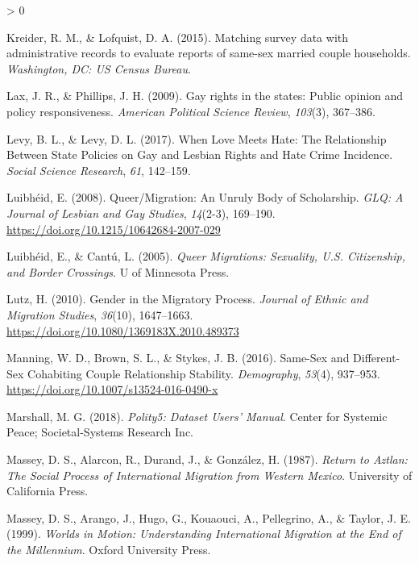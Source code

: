 \documentclass[
  11pt,
]{article}
\newlength{\cslhangindent}
\newenvironment{CSLReferences}[2] %
 {%
  \setlength{\parindent}{0pt}
  \ifodd #1 \everypar{\setlength{\hangindent}{\cslhangindent}}\ignorespaces\fi
  \ifnum #2 > 0
  \setlength{\parskip}{#2\baselineskip}
  \fi
 }%
 {}
\begin{document}
\begin{CSLReferences}{1}{0}
\leavevmode\hypertarget{ref-kreider_2015}{}%
Kreider, R. M., \& Lofquist, D. A. (2015). Matching survey data with administrative records to evaluate reports of same-sex married couple households. \emph{Washington, DC: US Census Bureau}.

\leavevmode\hypertarget{ref-lax_2009}{}%
Lax, J. R., \& Phillips, J. H. (2009). Gay rights in the states: {Public} opinion and policy responsiveness. \emph{American Political Science Review}, \emph{103}(3), 367--386.

\leavevmode\hypertarget{ref-levy_2017}{}%
Levy, B. L., \& Levy, D. L. (2017). When {Love} {Meets} {Hate}: {The} {Relationship} {Between} {State} {Policies} on {Gay} and {Lesbian} {Rights} and {Hate} {Crime} {Incidence}. \emph{Social Science Research}, \emph{61}, 142--159.

\leavevmode\hypertarget{ref-luibheid_2008}{}%
Luibhéid, E. (2008). Queer/{Migration}: {An} {Unruly} {Body} of {Scholarship}. \emph{GLQ: A Journal of Lesbian and Gay Studies}, \emph{14}(2-3), 169--190. \url{https://doi.org/10.1215/10642684-2007-029}

\leavevmode\hypertarget{ref-luibheid_2005}{}%
Luibhéid, E., \& Cantú, L. (2005). \emph{Queer {Migrations}: {Sexuality}, {U}.{S}. {Citizenship}, and {Border} {Crossings}}. U of Minnesota Press.

\leavevmode\hypertarget{ref-lutz_2010}{}%
Lutz, H. (2010). Gender in the {Migratory} {Process}. \emph{Journal of Ethnic and Migration Studies}, \emph{36}(10), 1647--1663. \url{https://doi.org/10.1080/1369183X.2010.489373}

\leavevmode\hypertarget{ref-manning_2016}{}%
Manning, W. D., Brown, S. L., \& Stykes, J. B. (2016). Same-{Sex} and {Different}-{Sex} {Cohabiting} {Couple} {Relationship} {Stability}. \emph{Demography}, \emph{53}(4), 937--953. \url{https://doi.org/10.1007/s13524-016-0490-x}

\leavevmode\hypertarget{ref-marshall_2018}{}%
Marshall, M. G. (2018). \emph{Polity5: {Dataset} {Users}' {Manual}}. Center for Systemic Peace; Societal-Systems Research Inc.

\leavevmode\hypertarget{ref-massey_1987}{}%
Massey, D. S., Alarcon, R., Durand, J., \& González, H. (1987). \emph{Return to {Aztlan}: {The} {Social} {Process} of {International} {Migration} from {Western} {Mexico}}. University of California Press.

\leavevmode\hypertarget{ref-massey_1999}{}%
Massey, D. S., Arango, J., Hugo, G., Kouaouci, A., Pellegrino, A., \& Taylor, J. E. (1999). \emph{Worlds in {Motion}: {Understanding} {International} {Migration} at the {End} of the {Millennium}}. Oxford University Press.


\end{CSLReferences}
\end{document}
